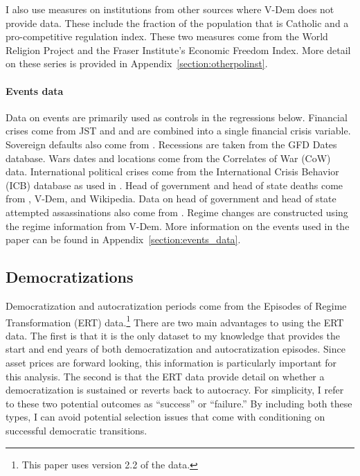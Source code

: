 \documentclass[12pt]{article}
\numberwithin{equation}{section}
\begin{document}
I also use measures on institutions from other sources where V-Dem does not provide data. These include the fraction of the population that is Catholic and a pro-competitive regulation index. These two measures come from the World Religion Project and the Fraser Institute's Economic Freedom Index. More detail on these series is provided in Appendix~\ref{section:otherpolinst}.

\paragraph{Events data}\label{section:eventsapp}
Data on events are primarily used as controls in the regressions below. Financial crises come from JST and \cite*{Reinhart2009} and are combined into a single financial crisis variable. Sovereign defaults also come from \cite*{Reinhart2009}. Recessions are taken from the GFD Dates database. Wars dates and locations come from the Correlates of War (CoW) data. International political crises come from the International Crisis Behavior (ICB) database as used in \cite*{Berkman2011}. Head of government and head of state deaths come from \cite*{Jones2009}, V-Dem, and Wikipedia. Data on head of government and head of state attempted assassinations also come from \cite*{Jones2009}. Regime changes are constructed using the regime information from V-Dem. More information on the events used in the paper can be found in Appendix~\ref{section:events_data}.

\subsection{Democratizations}\label{section:democratization_data}

Democratization and autocratization periods come from the Episodes of Regime Transformation (ERT) data.\footnote{This paper uses version 2.2 of the data.} There are two main advantages to using the ERT data. The first is that it is the only dataset to my knowledge that provides the start and end years of both democratization and autocratization episodes. Since asset prices are forward looking, this information is particularly important for this analysis. The second is that the ERT data provide detail on whether a democratization is sustained or reverts back to autocracy. For simplicity, I refer to these two potential outcomes as ``success'' or ``failure.'' By including both these types, I can avoid potential selection issues that come with conditioning on successful democratic transitions.
\end{document}

